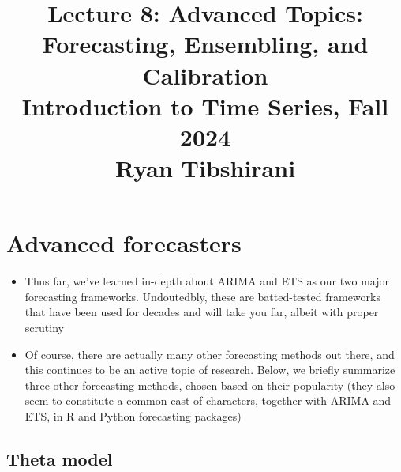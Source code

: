 \documentclass{article}
\title{Lecture 8: Advanced Topics: Forecasting, Ensembling, and Calibration \\
  \smallskip  
\large Introduction to Time Series, Fall 2024 \\ \smallskip
Ryan Tibshirani}
\date{}
\begin{document}
\maketitle
\RaggedRight
\vspace{-50pt}

\section{Advanced forecasters}

\begin{itemize}
\item Thus far, we've learned in-depth about ARIMA and ETS as our two major 
  forecasting frameworks. Undoutedbly, these are batted-tested frameworks that 
  have been used for decades and will take you far, albeit with proper scrutiny 

\item Of course, there are actually many other forecasting methods out there,
  and this continues to be an active topic of research. Below, we briefly
  summarize three other forecasting methods, chosen based on their popularity
  (they also seem to constitute a common cast of characters, together with ARIMA
  and ETS, in R and Python forecasting packages)       
\end{itemize}

\subsection{Theta model}
\end{document}
